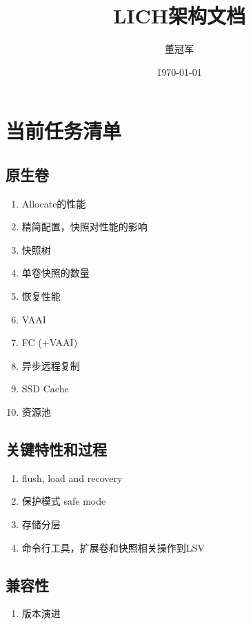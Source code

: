 \documentclass[UTF8]{ctexart}
\title{LICH架构文档}
\author{董冠军}
\date{\today}
\begin{document}
\maketitle
\tableofcontents

\section{当前任务清单}

\subsection{原生卷}

\begin{tcolorbox}
\begin{enumerate}
    \item Allocate的性能
    \item 精简配置，快照对性能的影响
    \item 快照树
    \item 单卷快照的数量
    \item 恢复性能
    \item VAAI
    \item FC (+VAAI)
    \item 异步远程复制
    \item SSD Cache
    \item 资源池
\end{enumerate}
\end{tcolorbox}

\subsection{关键特性和过程}

\begin{enumerate}
    \item flush, load and recovery
    \item 保护模式 safe mode
    \item 存储分层
    \item 命令行工具，扩展卷和快照相关操作到LSV
\end{enumerate}

\subsection{兼容性}

\begin{enumerate}
    \item 版本演进
\end{enumerate}
\end{document}

